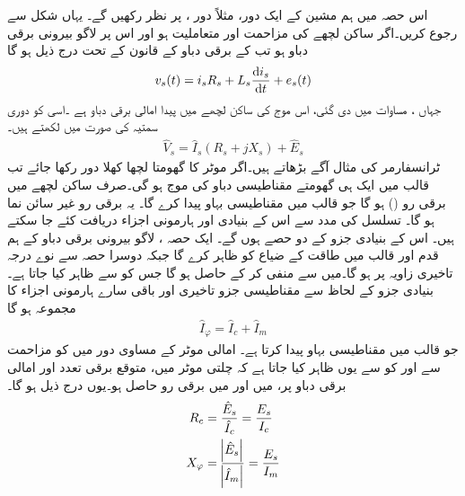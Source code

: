 اس حصہ میں ہم مشین کے ایک دور، مثلاً دور ،  پر نظر رکھیں گے۔ یہاں شکل   سے رجوع کریں۔اگر ساکن لچھے کی مزاحمت  اور متعاملیت  ہو اور اس پر لاگو بیرونی برقی دباو  ہو تب  کے برقی دباو کے قانون کے تحت درج ذیل ہو گا
\begin{align}
v_s(t)=i_s R_s +L_s \frac{\dif i_s}{\dif t}+e_s(t)
\end{align}
جہاں ،  مساوات   میں دی گئی، اس موج کی ساکن لچھے میں پیدا امالی برقی دباو ہے ۔اسی کو دوری سمتیہ کی صورت میں لکھتے ہیں۔
\begin{align}\label{مساوات_امالی_دوری_موٹر_مساوات}
\hat{V}_s=\hat{I}_s \left(R_s+j X_s \right)+\hat{E}_s
\end{align}
ٹرانسفارمر کی مثال آگے بڑھاتے ہیں۔اگر موٹر کا گھومتا لچھا کھلا دور رکھا جائے تب قالب میں ایک ہی گھومتے مقناطیسی دباو کی موج  ہو گی۔صرف ساکن لچھے میں برقی رو () ہو گا جو قالب میں مقناطیسی بہاو  پیدا کرے گا۔ یہ برقی رو  غیر سائن نما ہو گا۔  تسلسل کی مدد سے اس کے بنیادی  اور ہارمونی اجزاء دریافت کئے جا سکتے ہیں۔ اس کے بنیادی جزو کے دو حصے ہوں گے۔ ایک حصہ  ، لاگو بیرونی برقی دباو  کے ہم قدم اور قالب میں طاقت کے ضیاع کو ظاہر کرے گا جبکہ  دوسرا حصہ  سے نوے درجہ تاخیری زاویہ پر ہو گا۔میں سے  منفی کر کے  حاصل ہو گا جس کو   سے ظاہر کیا جاتا ہے۔ بنیادی جزو کے لحاظ سے مقناطیسی جزو  تاخیری   اور باقی سارے ہارمونی اجزاء کا مجموعہ ہو گا
\begin{align}
\hat{I}_\varphi=\hat{I}_c+\hat{I}_m
\end{align}
جو قالب میں مقناطیسی بہاو  پیدا کرتا ہے۔ امالی موٹر کے مساوی دور میں  کو مزاحمت  سے اور  کو  سے یوں ظاہر کیا جاتا ہے کہ چلتی موٹر میں، متوقع برقی تعدد  اور امالی برقی دباو  پر،   میں  اور  میں  برقی رو حاصل ہو۔یوں درج ذیل ہو گا۔
\begin{gather}
\begin{aligned}
R_c&=\frac{\hat{E}_s}{\hat{I}_c}=\frac{E_s}{I_c}\\
X_\varphi&=\frac{\abs{\hat{E}_s}}{\abs{\hat{I}_m}}=\frac{E_s}{I_m}
\end{aligned}
\end{gather}
